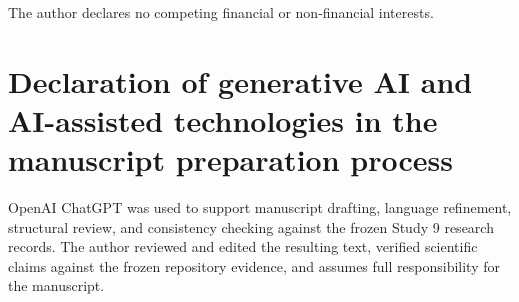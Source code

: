 \documentclass[preprint,12pt]{elsarticle}
\begin{document}
The author declares no competing financial or non-financial interests.

\section*{Declaration of generative AI and AI-assisted technologies in the manuscript preparation process}

OpenAI ChatGPT was used to support manuscript drafting, language refinement, structural review, and consistency checking against the frozen Study 9 research records. The author reviewed and edited the resulting text, verified scientific claims against the frozen repository evidence, and assumes full responsibility for the manuscript.



\end{document}
